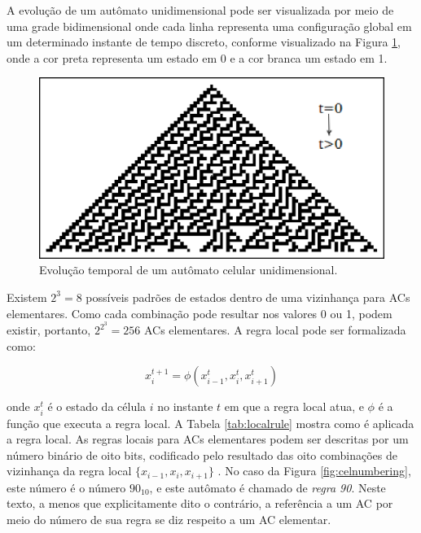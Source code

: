 \documentclass[12pt,a4paper]{article}
\begin{document}
A evolução de um autômato unidimensional pode ser visualizada por meio de uma grade bidimensional
onde cada linha representa uma configuração global em um determinado instante de tempo discreto,
conforme visualizado na Figura \ref{fig:celautomaton}, onde a cor preta representa um estado em 0
e a cor branca um estado em 1.

\begin{figure}[htp]
\begin{center}
\includegraphics[scale=0.8]{img/CellularAutomaton.eps}
\caption{Evolução temporal de um autômato celular unidimensional.}
\label{fig:celautomaton}
\end{center}
\end{figure}

Existem $2^3=8$ possíveis padrões de estados dentro de uma vizinhança para ACs elementares.
Como cada combinação pode resultar nos valores 0 ou 1, podem existir, portanto, $2^{2^3}=256$ ACs
elementares. A regra local pode ser formalizada como:

\begin{equation}
x^{t+1}_i = \phi(x^t_{i-1}, x^t_i, x^t_{i+1})
\end{equation}

\noindent onde $x^t_i$ é o estado da célula $i$ no instante $t$ em que a
regra local atua, e $\phi$ é a função que executa a regra local.  A Tabela
\ref{tab:localrule} mostra como é aplicada a regra local.  As regras locais
para ACs elementares podem ser descritas por um número binário de oito bits,
codificado pelo resultado das oito combinações de vizinhança da regra local
$\{x_{i-1},x_i,x_{i+1}\}$ . No caso da Figura
\ref{fig:celnumbering}, este número é o número $90_{10}$, e este autômato
é chamado de \textit{regra 90}. Neste texto, a menos que explicitamente
dito o contrário, a referência a um AC por meio do número de sua regra se
diz respeito a um AC elementar.
\end{document}
